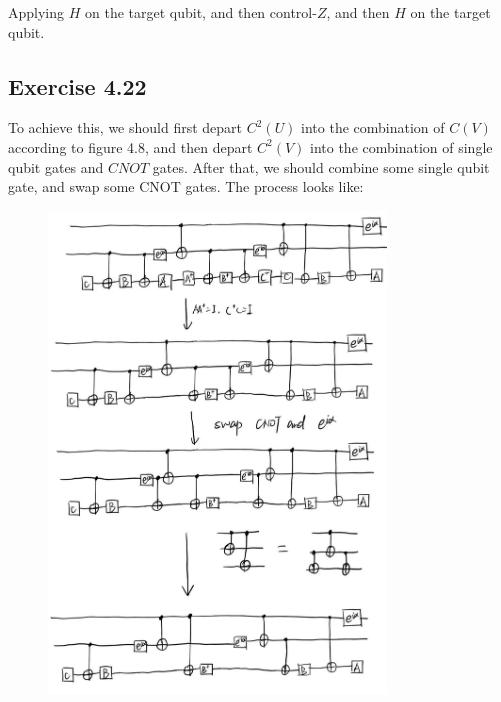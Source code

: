 Applying $H$ on the target qubit, and then control-$Z$, and then $H$ on the target qubit.

\subsection*{Exercise 4.22}

To achieve this, we should first depart $C^2(U)$ into the combination of $C(V)$ according to figure 4.8, and then depart $C^2(V)$ into the combination of single qubit gates and $CNOT$ gates. After that, we should combine some single qubit gate, and swap some CNOT gates. The process looks like: 
\begin{figure}[htbp]
    \centering
    \includegraphics[width=0.8\textwidth]{figures/4-22.jpg}
    \caption{}
    \label{}
\end{figure}